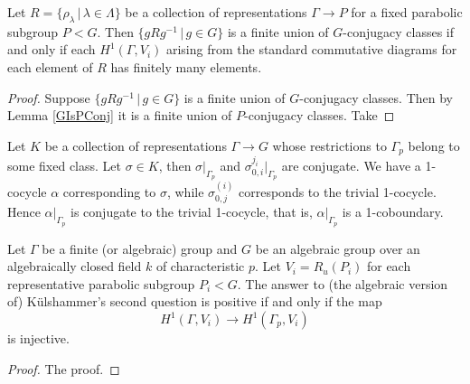 \begin{lemma}\label{PConjIsHOne} Let $R=\{\rho_\lambda\, |\, \lambda \in \Lambda\}$ be a collection of representations $\Gamma\rightarrow P$ for a fixed parabolic subgroup $P<G$. Then $\{gRg^{-1}\,|\,g\in G\}$ is a finite union of $G$-conjugacy classes if and only if each $H^1(\Gamma, V_i)$ arising from the standard commutative diagrams for each element of $R$ has finitely many elements.
\end{lemma}
\begin{proof}
	Suppose $\{gRg^{-1}\,|\,g \in G\}$ is a finite union of $G$-conjugacy classes. Then by Lemma \ref{GIsPConj} it is a finite union of $P$-conjugacy classes. Take
\end{proof}



Let $K$ be a collection of representations $\Gamma \rightarrow G$ whose restrictions to $\Gamma_p$ belong to some fixed class. Let $\sigma\in K$, then $\sigma|_{\Gamma_p}$ and $\sigma^{j_i}_{0,i}|_{\Gamma_p}$ are conjugate. We have a 1-cocycle $\alpha$ corresponding to $\sigma$, while $\sigma_{0,j}^{(i)}$ corresponds to the trivial 1-cocycle. Hence $\alpha|_{\Gamma_p}$ is conjugate to the trivial 1-cocycle, that is, $\alpha|_{\Gamma_p}$ is a 1-coboundary. 

% 
% 
% 
% 



\begin{lemma}\label{kToHOne} Let $\Gamma$ be a finite (or algebraic) group and $G$ be an algebraic group over an algebraically closed field $k$ of characteristic $p$. Let $V_i = R_u(P_i)$ for each representative parabolic subgroup $P_i<G$. The answer to (the algebraic version of) K\"ulshammer's second question is positive if and only if the map
	\begin{displaymath}
		H^1(\Gamma, V_i) \rightarrow H^1(\Gamma_p, V_i)
	\end{displaymath}
	is injective.
\end{lemma}
\begin{proof}
	The proof.
\end{proof}

